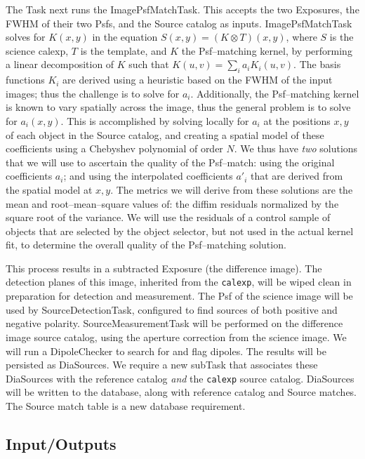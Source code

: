 \documentclass[12pt]{article}
\begin{document}
The Task next runs the ImagePsfMatchTask.  This accepts the two
Exposures, the FWHM of their two Psfs, and the Source catalog as
inputs.  ImagePsfMatchTask solves for $K(x,y)$ in the
equation $S(x,y) = (K \otimes T)(x,y)$, where $S$ is the science
calexp, $T$ is the template, and $K$ the Psf--matching kernel, by
performing a linear decomposition of $K$ such that $K(u,v) = \sum_i
a_i K_i(u,v)$.  The basis functions $K_i$ are derived using a
heuristic based on the FWHM of the input images; thus the challenge is to solve for $a_i$.
Additionally, the Psf--matching kernel is known to vary spatially
across the image, thus the general problem is to solve for $a_i(x,y)$.
This is accomplished by solving locally for $a_i$ at the positions
$x,y$ of each object in the Source catalog, and creating a spatial
model of these coefficients using a Chebyshev polynomial of order $N$.
We thus have {\it two} solutions that we will use to ascertain the
quality of the Psf--match: using the original coefficients $a_i$; and
using the interpolated coefficients $a{'}_i$ that are derived from the
spatial model at $x,y$.  The metrics we will derive from these
solutions are the mean and root--mean--square values of: the diffim
residuals normalized by the square root of the variance.  We will use
the residuals of a control sample of objects that are selected by the
object selector, but not used in the actual kernel fit, to determine
the overall quality of the Psf--matching solution.

This process results in a subtracted Exposure (the difference image).
The detection planes of this image, inherited from the {\tt calexp},
will be wiped clean in preparation for detection and measurement.  The
Psf of the science image will be used by SourceDetectionTask,
configured to find sources of both positive and negative polarity.
SourceMeasurementTask will be performed on the difference image source
catalog, using the aperture correction from the science image.  We
will run a DipoleChecker to search for and flag
dipoles.  The results will be persisted as DiaSources.  We require a
new subTask that associates these DiaSources with the reference
catalog {\it and} the {\tt calexp} source catalog.  DiaSources will be written to the database,
along with reference catalog and Source matches.  The Source match
table is a new database requirement.

\subsection{Input/Outputs}
\end{document}
